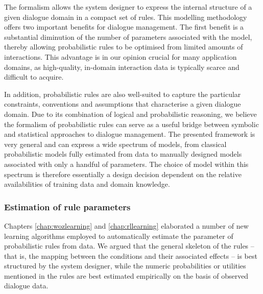 The formalism allows the system designer to express the internal structure of a given dialogue domain in a compact set of rules. This modelling methodology offers two important benefits for dialogue management.  The first benefit is a substantial diminution of the number of parameters associated with the model, thereby allowing probabilistic rules to be optimised from limited amounts of interactions. This advantage is in our opinion crucial for many application domains, as high-quality, in-domain interaction data is typically scarce and difficult to acquire.

In addition, probabilistic rules are also well-suited to capture the particular constraints, conventions and assumptions that characterise a given dialogue domain.  Due to its combination of logical and probabilistic reasoning, we believe the formalism of probabilistic rules can serve as a useful bridge between symbolic and statistical approaches to dialogue management.  The presented framework is very general and can express a wide spectrum of models, from classical probabilistic models fully estimated from data to manually designed models associated with only a handful of parameters. The choice of model within this spectrum is therefore essentially a design decision dependent on the relative availabilities of training data and domain knowledge.


\subsubsection*{Estimation of rule parameters}
Chapters \ref{chap:wozlearning} and \ref{chap:rllearning} elaborated a number of new learning algorithms employed to automatically estimate the parameter of probabilistic rules from data. We argued that the general skeleton of the rules -- that is, the mapping between the conditions and their associated effects -- is best structured by the system designer, while the numeric probabilities or utilities mentioned in the rules are best estimated empirically on the basis of observed dialogue data. 

